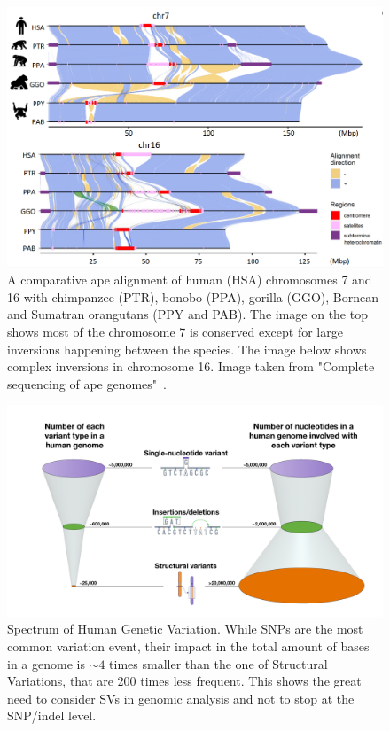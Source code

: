 \begin{figure}[!ht]
	\centering
	\includegraphics[width=\linewidth]{figures/background/genome_diff.png}
	\caption[Genomic difference in chromosome 7 and 16 of 5 primate species.]{A comparative ape alignment of human (HSA) chromosomes 7 and 16 with chimpanzee (PTR), bonobo (PPA), gorilla (GGO), Bornean and Sumatran orangutans (PPY and PAB). The image on the top shows most of the chromosome 7 is conserved except for large inversions happening between the species. The image below shows complex inversions in chromosome 16. Image taken from "Complete sequencing of ape genomes"~\cite{ape_genomes}.}
	\label{fig:chromosome_diff}
\end{figure}

\begin{figure}[!ht]\clearpage
	\centering
	\includegraphics[width=.95\linewidth]{figures/background/genomic_spectrum.png}
	\caption[Spectrum of Human Genetic Variation.]{Spectrum of Human Genetic Variation. While SNPs are the most common variation event, their impact in the total amount of bases in a genome is $\sim4$ times smaller than the one of Structural Variations, that are 200 times less frequent. This shows the great need to consider SVs in genomic analysis and not to stop at the SNP/indel level.\\}
	\label{fig:variation_spectrum}
\end{figure}

